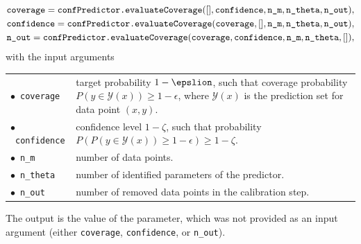 \begin{equation*}
	\begin{split}
		&\texttt{coverage} = {\normalfont \texttt{confPredictor.evaluateCoverage}}([], \texttt{confidence}, \texttt{n\_m}, \texttt{n\_theta}, \texttt{n\_out}),\\
		&\texttt{confidence} = {\normalfont \texttt{confPredictor.evaluateCoverage}}(\texttt{coverage}, [], \texttt{n\_m}, \texttt{n\_theta}, \texttt{n\_out}),\\
		&\texttt{n\_out} = {\normalfont \texttt{confPredictor.evaluateCoverage}}(\texttt{coverage}, \texttt{confidence}, \texttt{n\_m}, \texttt{n\_theta}, []),
	\end{split}
\end{equation*}
with the input arguments
\begin{center}
	\renewcommand{\arraystretch}{1.3}
	\begin{tabular}[t]{l p{13cm} }
		$\bullet$~\texttt{coverage} & target probability $1-\epslion$, such that coverage probability  $P(y\in \mathcal{Y}(x)) \geq 1-\epsilon$, where $\mathcal{Y}(x)$ is the prediction set for data point $(x,y)$.\\
		$\bullet$~\texttt{confidence} & confidence level $1-\zeta$, such that probability $P(P(y\in\mathcal{Y}(x)) \geq 1-\epsilon) \geq 1-\zeta$.\\
		$\bullet$~\texttt{n\_m} & number of data points.\\
		$\bullet$~\texttt{n\_theta} & number of identified parameters of the predictor.\\
		$\bullet$~\texttt{n\_out} & number of removed data points in the calibration step.\\
	\end{tabular}
\end{center}
The output is the value of the parameter, which was not provided as an input argument (either \texttt{coverage}, \texttt{confidence}, or \texttt{n\_out}).
